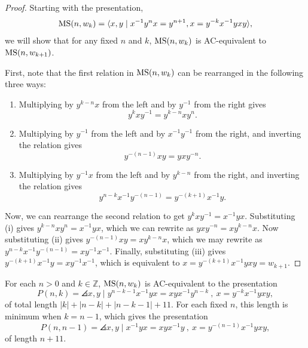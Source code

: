 \begin{proof}
    Starting with the presentation,
        \[
\text{MS}(n, w_k) = \langle x, y \mid x^{-1} y^n x = y^{n+1}, x = y^{-k} x^{-1} y x y\rangle,
\]
    we will show that for any fixed $n$ and $k$, $\text{MS}(n, w_k)$ is AC-equivalent to $\text{MS}(n, w_{k+1})$.

    First, note that the first relation in $\text{MS}(n, w_k)$ can be rearranged in the following three ways:
    \begin{enumerate}[label=(\roman*)]
        \item Multiplying by $y^{k-n}x$ from the left and by $y^{-1}$ from the right gives 
        \[
            y^kxy^{-1}=y^{k-n}xy^n.
        \]
        \item Multiplying by $y^{-1}$ from the left and by $x^{-1}y^{-1}$ from the right, and inverting the relation gives 
        \[
            y^{-(n-1)}xy = yxy^{-n}.
        \]
        \item Multiplying by $y^{-1}x$ from the left and by $y^{k-n}$ from the right, and inverting the relation gives
        \[
            y^{n-k}x^{-1}y^{-(n-1)}=y^{-(k+1)}x^{-1}y.
        \]
    \end{enumerate}

    Now, we can rearrange the second relation  to get $y^k x y^{-1}=x^{-1}yx$. Substituting (i) gives $y^{k-n} x y^n = x^{-1}yx$, which  we can rewrite as $yxy^{-n}=xy^{k-n}x$. Now substituting (ii) gives $ y^{-(n-1)}xy= xy^{k-n}x$, which we may rewrite as $y^{n-k}x^{-1}y^{-(n-1)}=xy^{-1}x^{-1}$. Finally, substituting (iii) gives $y^{-(k+1)}x^{-1}y=xy^{-1}x^{-1}$, which is equivalent to $x=y^{-(k+1)}x^{-1}yxy=w_{k+1}$. 
\end{proof}

\begin{theorem}\label{t:ms-short}
    For each $n > 0$ and $k \in \mathbb{Z}$, $\text{MS}(n, w_k)$ is AC-equivalent to the presentation
    \[P(n, k) = \angles{x, y \mid  y^{n-k-1}  x^{-1} y x = x y x^{-1} y^{n-k} \ , \ x = y^{-k} x^{-1} y x y },
    \]
    of total length $|k| + |n - k| + |n - k - 1| + 11$. For each fixed $n$, this length is minimum when $k=n-1$, which gives the presentation
    \[P(n, n-1) = \angles{x, y \mid   x^{-1} y x = x y x^{-1} y \ , \ x = y^{-(n-1)} x^{-1} y x y },
    \]
    of length $n+11$.
\end{theorem}

